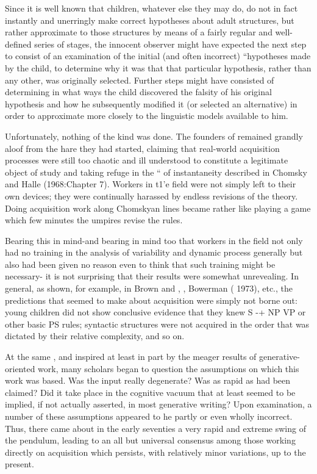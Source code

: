 Since it is well known that children, whatever else they may do, do not in fact instantly and unerringly make correct hypotheses about adult structures, but rather approximate to those structures by means of a fairly regular and well-defined series of stages, the innocent ob\-server might have expected the next step to consist of an examination of the initial (and often incorrect) ``hypotheses made by the child, to determine why it was that that particular hypothesis, rather than any other, was originally selected. Further steps might have con\-sisted of determining in what ways the child discovered the falsity of his original hypothesis and how he subsequently modified it (or selected an alternative) in order to approximate more closely to the linguistic models available to him.

Unfortunately, nothing of the kind was done. The founders of  remained grandly aloof from the hare they had started, claiming that real-world acquisition processes were still too chaotic and ill understood to constitute a legitimate object of study and taking refuge in the `` of instantaneity described in Chomsky and Halle (1968:Chapter 7). Workers in t1'e field were not simply left to their own devices; they were continually harassed by endless revisions of the theory. Doing acquisition work along Chom\-skyan lines became rather like playing a game which few minutes the umpires revise the rules.

Bearing this in mind-and bearing in mind too that workers in the field not only had no training in the analysis of variability and dynamic process generally but also had been given no reason even to think that such training might be necessary- it is not surprising that their results were somewhat unrevealing. In general, as shown, for example, in Brown and \citet{Hanlon1970}, \citet{Brown1973}, Bowerman ( 1973), etc., the predictions that  seemed to make about acquisition were simply not borne out: young children did not
show conclusive evidence that they knew S {}-+ NP VP or other basic PS
rules; syntactic structures were not acquired in the order that was dictated by their relative complexity, and so on.

At the same , and inspired at least in part by the meager results of generative-oriented work, many scholars began to question the assumptions on which this work was based. Was the input really degenerate? Was  as rapid as had been claimed? Did it take place in the cognitive vacuum that at least seemed to be implied, if not actually asserted, in most generative writing? Upon examination, a number of these assumptions appeared to he partly or even wholly incorrect. Thus, there came about in the early seventies a very rapid and extreme swing of the pendulum, leading to an all but universal consensus among those working directly on acquisition which persists, with relatively minor variations, up to the present.

